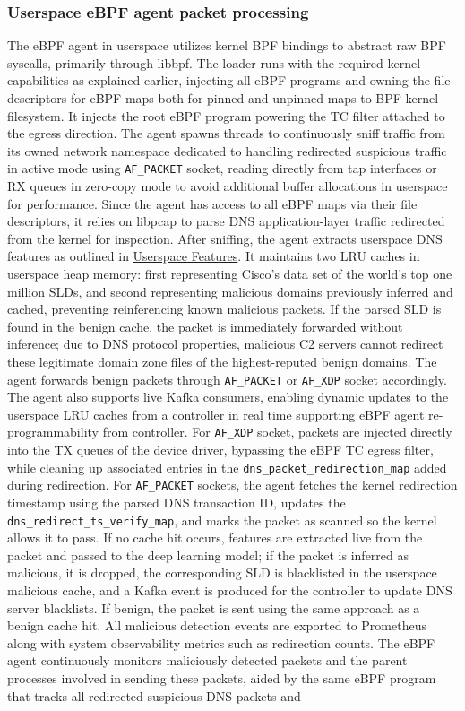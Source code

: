 \documentclass [11pt, proquest] {uwthesis}[2020/02/24]
\begin{document}
\subsubsection{\textbf{Userspace eBPF agent packet processing}}
\label{active:sec2}
The eBPF agent in userspace utilizes kernel BPF bindings to abstract raw BPF syscalls, primarily through libbpf. The loader runs with the required kernel capabilities as explained earlier, injecting all eBPF programs and owning the file descriptors for eBPF maps both for pinned and unpinned maps to BPF kernel filesystem. It injects the root eBPF program powering the TC filter attached to the egress direction. The agent spawns threads to continuously sniff traffic from its owned network namespace dedicated to handling redirected suspicious traffic in active mode using \texttt{AF\_PACKET} socket, reading directly from tap interfaces or RX queues in zero-copy mode to avoid additional buffer allocations in userspace for performance. Since the agent has access to all eBPF maps via their file descriptors, it relies on libpcap to parse DNS application-layer traffic redirected from the kernel for inspection. After sniffing, the agent extracts userspace DNS features as outlined in \hyperref[sec:feature-userspace]{Userspace Features}. It maintains two LRU caches in userspace heap memory: first representing Cisco's data set of the world's top one million SLDs, and second representing malicious domains previously inferred and cached, preventing reinferencing known malicious packets. If the parsed SLD is found in the benign cache, the packet is immediately forwarded without inference; due to DNS protocol properties, malicious C2 servers cannot redirect these legitimate domain zone files of the highest-reputed benign domains. The agent forwards benign packets through \texttt{AF\_PACKET} or \texttt{AF\_XDP} socket accordingly. The agent also supports live Kafka consumers, enabling dynamic updates to the userspace LRU caches from a controller in real time supporting eBPF agent re-programmability from controller. For \texttt{AF\_XDP} socket, packets are injected directly into the TX queues of the device driver, bypassing the eBPF TC egress filter, while cleaning up associated entries in the \texttt{dns\_packet\_redirection\_map} added during redirection. For \texttt{AF\_PACKET} sockets, the agent fetches the kernel redirection timestamp using the parsed DNS transaction ID, updates the \texttt{dns\_redirect\_ts\_verify\_map}, and marks the packet as scanned so the kernel allows it to pass. If no cache hit occurs, features are extracted live from the packet and passed to the deep learning model; if the packet is inferred as malicious, it is dropped, the corresponding SLD is blacklisted in the userspace malicious cache, and a Kafka event is produced for the controller to update DNS server blacklists. If benign, the packet is sent using the same approach as a benign cache hit. All malicious detection events are exported to Prometheus along with system observability metrics such as redirection counts. The eBPF agent continuously monitors maliciously detected packets and the parent processes involved in sending these packets, aided by the same eBPF program that tracks all redirected suspicious DNS packets and 
\end{document}
